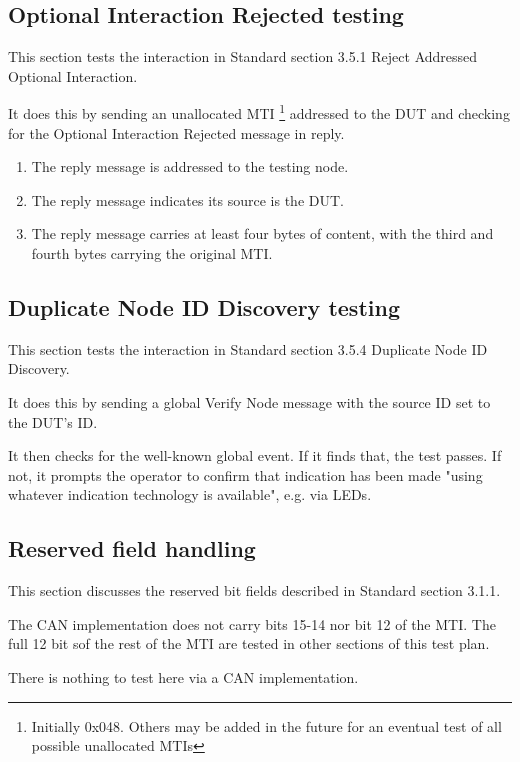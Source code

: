 \documentclass[11pt]{article}
\begin{document}
\subsection{Optional Interaction Rejected testing}

This section tests the interaction in Standard section 3.5.1 Reject Addressed Optional Interaction.

It does this by sending an unallocated MTI
\footnote{Initially 0x048. Others may be added in the future for an eventual
    test of all possible unallocated MTIs}
addressed to the DUT and checking for the Optional Interaction Rejected 
message in reply.

    \begin{enumerate}
    \item The reply message is addressed to the testing node.
    \item The reply message indicates its source is the DUT.
    \item The reply message carries at least four bytes of content, with the 
            third and fourth bytes carrying the original MTI.
    \end{enumerate}

\subsection{Duplicate Node ID Discovery testing}

This section tests the interaction in Standard section 3.5.4 Duplicate Node ID Discovery.

It does this by sending a global Verify Node message with the source ID set to the DUT's ID.

It then checks for the well-known global event.  If it finds that, the test passes.
If not, it prompts the operator to confirm that indication has been made 
"using whatever indication technology is available", e.g. via LEDs.

\subsection{Reserved field handling}

This section discusses the reserved bit fields described in Standard section 3.1.1.

The CAN implementation does not carry bits 15-14 nor bit 12 of the MTI. 
The full 12 bit sof the rest of the MTI are tested in other sections of this test plan.

There is nothing to test here via a CAN implementation.
\end{document}
